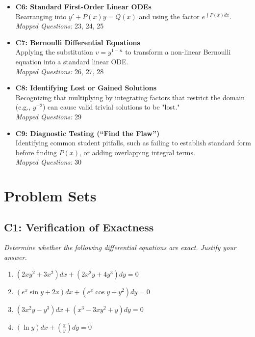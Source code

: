 \documentclass[11pt]{article}
\begin{document}
\begin{itemize}
    \item \textbf{C6: Standard First-Order Linear ODEs} \\
    Rearranging into $y' + P(x)y = Q(x)$ and using the factor $e^{\int P(x) dx}$. \\
    \textit{Mapped Questions:} 23, 24, 25
    
    \item \textbf{C7: Bernoulli Differential Equations} \\
    Applying the substitution $v = y^{1-n}$ to transform a non-linear Bernoulli equation into a standard linear ODE. \\
    \textit{Mapped Questions:} 26, 27, 28
    
    \item \textbf{C8: Identifying Lost or Gained Solutions} \\
    Recognizing that multiplying by integrating factors that restrict the domain (e.g., $y^{-2}$) can cause valid trivial solutions to be "lost." \\
    \textit{Mapped Questions:} 29
    
    \item \textbf{C9: Diagnostic Testing (``Find the Flaw'')} \\
    Identifying common student pitfalls, such as failing to establish standard form before finding $P(x)$, or adding overlapping integral terms. \\
    \textit{Mapped Questions:} 30
\end{itemize}

\newpage
\section{Problem Sets}

\subsection*{C1: Verification of Exactness}
\textit{Determine whether the following differential equations are exact. Justify your answer.}

\begin{enumerate}
    \item $(2xy^2 + 3x^2) dx + (2x^2y + 4y^3) dy = 0$
    \item $(e^x \sin y + 2x) dx + (e^x \cos y + y^2) dy = 0$
    \item $(3x^2 y - y^3) dx + (x^3 - 3xy^2 + y) dy = 0$
    \item $(\ln y) dx + \left(\frac{x}{y}\right) dy = 0$
\end{enumerate}
\end{document}
